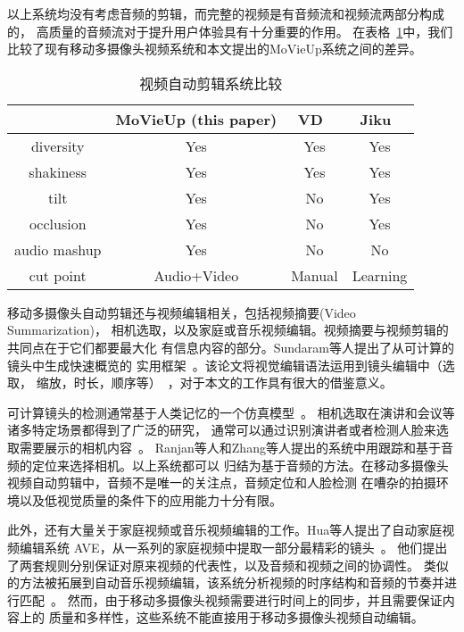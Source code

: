 以上系统均没有考虑音频的剪辑，而完整的视频是有音频流和视频流两部分构成的，
高质量的音频流对于提升用户体验具有十分重要的作用。
在表格~\ref{tab:mashup-comp}中，我们比较了现有移动多摄像头视频系统和本文提出的MoVieUp系统之间的差异。

\begin{table}[htbp]
    \centering
    \caption{视频自动剪辑系统比较} \label{tab:mashup-comp}
    \begin{tabular}{|c|c|c|c|}
    \hline
     & MoVieUp (this paper) & VD~\cite{DBLP:conf/mm/ShresthaWWBA10}
     & Jiku~\cite{DBLP:conf/mm/SainiGYO12}\\
    \hline
    diversity & Yes & Yes & Yes \\
    shakiness & Yes & Yes & Yes \\
    tilt & Yes & No & Yes \\
    occlusion & Yes & No & Yes \\
    audio mashup & Yes & No & No \\
    cut point & Audio+Video & Manual & Learning \\
    \hline
\end{tabular}
\end{table}

移动多摄像头自动剪辑还与视频编辑相关，包括视频摘要(Video Summarization)，
相机选取，以及家庭或音乐视频编辑。视频摘要与视频剪辑的共同点在于它们都要最大化
有信息内容的部分。Sundaram等人提出了从可计算的镜头中生成快速概览的
实用框架~\cite{sundaram2002computable}。该论文将视觉编辑语法运用到镜头编辑中（选取，
缩放，时长，顺序等）~\cite{CinemaElements1982}，对于本文的工作具有很大的借鉴意义。

可计算镜头的检测通常基于人类记忆的一个仿真模型~\cite{sundaram2002computable}。
相机选取在演讲和会议等诸多特定场景都得到了广泛的研究，
通常可以通过识别演讲者或者检测人脸来选取需要展示的相机内容~\cite{DBLP:journals/ieeemm/LampiKBE08,sumec2006multi}。
Ranjan等人和Zhang等人提出的系统中用跟踪和基于音频的定位来选择相机。以上系统都可以
归结为基于音频的方法。在移动多摄像头视频自动剪辑中，音频不是唯一的关注点，音频定位和人脸检测
在嘈杂的拍摄环境以及低视觉质量的条件下的应用能力十分有限。

此外，还有大量关于家庭视频或音乐视频编辑的工作。Hua等人提出了自动家庭视频编辑系统
AVE，从一系列的家庭视频中提取一部分最精彩的镜头~\cite{DBLP:conf/mm/HuaLZ03}。
他们提出了两套规则分别保证对原来视频的代表性，以及音频和视频之间的协调性。
类似的方法被拓展到自动音乐视频编辑，该系统分析视频的时序结构和音频的节奏并进行匹配~\cite{DBLP:conf/mm/HuaLZ04a}。
然而，由于移动多摄像头视频需要进行时间上的同步，并且需要保证内容上的
质量和多样性，这些系统不能直接用于移动多摄像头视频自动编辑。

